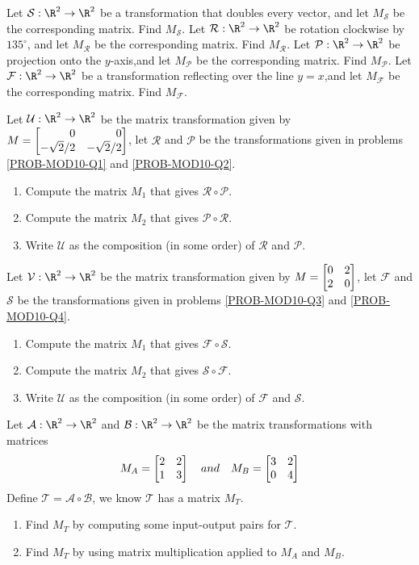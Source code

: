 \begin{exercises}
	\begin{problist}
	    \prob \label{PROB-MOD10-Q1}Let $\mathcal S:\R^2\to\R^2$ be a transformation that doubles every vector, and let $M_{\mathcal S}$ be the corresponding matrix. Find $M_{\mathcal S}$.
	    \prob \label{PROB-MOD10-Q2}Let $\mathcal R:\R^2\to\R^2$ be rotation clockwise by $135^\circ$, and let $M_{\mathcal R}$ be the corresponding matrix. Find $M_{\mathcal R}$.
	    \prob \label{PROB-MOD10-Q3}Let $\mathcal P:\R^2\to\R^2$ be projection onto the $y$-axis,and let $M_{\mathcal P}$ be the corresponding matrix. Find $M_{\mathcal P}$.
	    \prob \label{PROB-MOD10-Q4}Let $\mathcal F:\R^2\to\R^2$ be a transformation reflecting over the line $y=x$,and let $M_{\mathcal F}$ be the corresponding matrix. Find $M_{\mathcal F}$.
	    
	    \prob Let $\mathcal U:\R^2\to\R^2$ be the matrix transformation given by $M=\mat{0&0\\-\sqrt{2}/2 & -\sqrt{2}/2}$, let $\mathcal R$ and $\mathcal P$ be the transformations given in problems \ref{PROB-MOD10-Q1} and \ref{PROB-MOD10-Q2}.
		\begin{enumerate}
			\item   Compute the matrix $M_1$ that gives $\mathcal R \circ \mathcal P$.
			\item   Compute the matrix $M_2$ that gives $\mathcal P \circ \mathcal R$.
			\item   Write $\mathcal U$ as the composition (in some order) of $\mathcal R$ and $\mathcal P$.
		\end{enumerate}
		
		\prob Let $\mathcal V:\R^2\to\R^2$ be the matrix transformation given by $M=\mat{0&2\\2&0}$, let $\mathcal F$ and $\mathcal S$ be the transformations given in problems \ref{PROB-MOD10-Q3} and \ref{PROB-MOD10-Q4}.
		\begin{enumerate}
			\item   Compute the matrix $M_1$ that gives $\mathcal F \circ \mathcal S$.
			\item   Compute the matrix $M_2$ that gives $\mathcal S \circ \mathcal F$.
			\item   Write $\mathcal U$ as the composition (in some order) of $\mathcal F$ and $\mathcal S$.
		\end{enumerate}
		    
		\prob Let $\mathcal A: \R^2 \to \R^2$ and $\mathcal B: \R^2 \to \R^2$ be the matrix transformations with matrices
		\[
		    M_A = \mat{2&2\\1&3} \quad and \quad M_B = \mat{3&2\\0&4}
		\]
		Define $\mathcal T = \mathcal A \circ \mathcal B$, we know $\mathcal T$ has a matrix $M_T$. 
		\begin{enumerate}
		    \item Find $M_T$ by computing some input-output pairs for $\mathcal T$.
		    \item Find $M_T$ by using matrix multiplication applied to $M_A$ and $M_B$. 
		\end{enumerate}
		

\end{problist}
\end{exercises}
